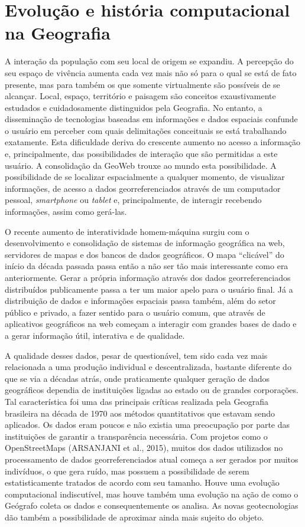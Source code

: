 \chapter{Evolução e história computacional na Geografia}
A interação da população com seu local de origem se expandiu. A percepção do seu espaço de vivência aumenta cada vez mais não só para o qual se está de fato presente, mas para também os que somente virtualmente são possíveis de se alcançar. Local, espaço, território e paisagem são conceitos exaustivamente estudados e cuidadosamente distinguidos pela Geografia. No entanto, a disseminação de tecnologias baseadas em informações e dados espaciais confunde o usuário em perceber com quais delimitações conceituais se está trabalhando exatamente. Esta dificuldade deriva do crescente aumento no acesso a informação e, principalmente, das possibilidades de interação que são permitidas a este usuário. A consolidação da GeoWeb trouxe ao mundo esta possibilidade. A possibilidade de se localizar espacialmente a qualquer momento, de visualizar informações, de acesso a dados georreferenciados através de um computador pessoal, \textit{smartphone} ou \textit{tablet} e, principalmente, de interagir recebendo informações, assim como gerá-las. 

O recente aumento de interatividade homem-máquina surgiu com o desenvolvimento e consolidação de sistemas de informação geográfica na web, servidores de mapas e dos bancos de dados geográficos. O mapa “clicável” do início da década passada passa então a não ser tão mais interessante como era anteriormente. Gerar a própria informação através dos dados georreferenciados distribuídos publicamente passa a ter um maior apelo para o usuário final. Já a distribuição de dados e informações espaciais passa também, além do setor público e privado, a fazer sentido para o usuário comum, que através de aplicativos geográficos na web começam a interagir com grandes bases de dado e a gerar informação útil, interativa e de qualidade. 

A qualidade desses dados, pesar de questionável, tem sido cada vez mais relacionada a uma produção individual e descentralizada, bastante diferente do que se via a décadas atrás, onde praticamente qualquer geração de dados geográficos dependia de instituições ligadas ao estado ou de grandes corporações. Tal característica foi uma das principais críticas realizada pela Geografia brasileira na década de 1970 aos métodos quantitativos que estavam sendo aplicados. Os dados eram poucos e não existia uma preocupação por parte das instituições de garantir a transparência necessária. Com projetos como o OpenStreetMaps (ARSANJANI et al., 2015), muitos dos dados utilizados no processamento de dados georreferenciados atual começa a ser gerados por muitos indivíduos, o que gera ruído, mas possuem a possibilidade de serem estatisticamente tratados de acordo com seu tamanho. Houve uma evolução computacional indiscutível, mas houve também uma evolução na ação de como o Geógrafo coleta os dados e consequentemente os analisa. As novas geotecnologias dão também a possibilidade de aproximar ainda mais sujeito do objeto. 

